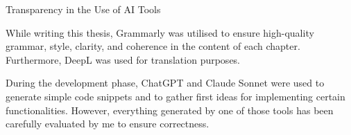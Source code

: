 \thispagestyle{empty}

\vspace*{20mm}

\begin{center}
    { Transparency in the Use of AI Tools}
\end{center}

\vspace{10mm}

While writing this thesis, Grammarly was utilised to ensure high-quality grammar, style, clarity, and coherence in the content of each chapter. Furthermore, DeepL was used for translation purposes. \par
During the development phase, ChatGPT and Claude Sonnet were used to generate simple code snippets and to gather first ideas for implementing certain functionalities. However, everything generated by one of those tools has been carefully evaluated by me to ensure correctness.

\cleardoublepage{}